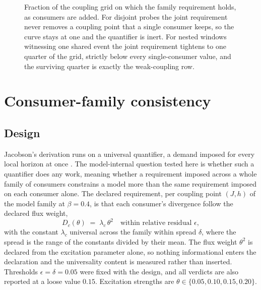 \documentclass[aps,prd,reprint,nofootinbib,longbibliography]{revtex4-2}
\begin{document}
\begin{figure}[t]
\centering
{}
\caption{Fraction of the coupling grid on which the family requirement
holds, as consumers are added.  For disjoint probes the joint requirement
never removes a coupling point that a single consumer keeps, so the curve
stays at one and the quantifier is inert.  For nested windows witnessing
one shared event the joint requirement tightens to one quarter of the
grid, strictly below every single-consumer value, and the surviving
quarter is exactly the weak-coupling row.}
\label{fig:family}
\end{figure}

\section{Consumer-family consistency}
\label{sec:family}

\subsection{Design}

Jacobson's derivation runs on a universal quantifier, a demand imposed for
every local horizon at once \cite{Jacobson1995}.  The model-internal
question tested here is whether such a quantifier does any work, meaning
whether a requirement imposed across a whole family of consumers
constrains a model more than the same requirement imposed on each consumer
alone.  The declared requirement, per coupling point $(J,h)$ of the model
family at $\beta=0.4$, is that each consumer's divergence follow the
declared flux weight,
\begin{equation}
D_c(\theta) \;=\; \lambda_c\,\theta^{2}
\quad\text{within relative residual } \epsilon,
\label{eq:law}
\end{equation}
with the constant $\lambda_c$ universal across the family within spread
$\delta$, where the spread is the range of the constants divided by their
mean.  The flux weight $\theta^{2}$ is declared from the excitation
parameter alone, so nothing informational enters the declaration and the
universality content is measured rather than inserted.  Thresholds
$\epsilon=\delta=0.05$ were fixed with the design, and all verdicts are
also reported at a loose value $0.15$.  Excitation strengths are
$\theta\in\{0.05,0.10,0.15,0.20\}$.
\end{document}
